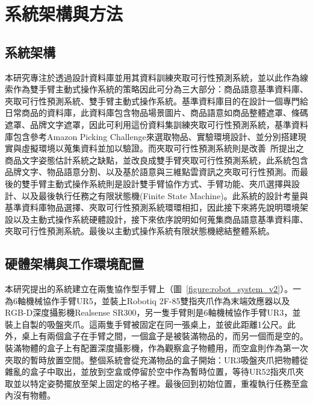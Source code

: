 \chapter{系統架構與方法}
\label{chapter:system}



\section{系統架構}
\label{sec:systemarchi}
本研究專注於透過設計資料庫並用其資料訓練夾取可行性預測系統，並以此作為線索作為雙手臂主動式操作系統的策略因此可分為三大部分：商品語意基準資料庫、夾取可行性預測系統、雙手臂主動式操作系統。基準資料庫目的在設計一個專門給日常商品的資料庫，此資料庫包含物品場景圖片、商品語意如商品整體遮罩、條碼遮罩、品牌文字遮罩，因此可利用這份資料集訓練夾取可行性預測系統，基準資料庫包含參考Amazon Picking Challenge來選取物品、實驗環境設計、並分別搭建現實與虛擬環境以蒐集資料並加以驗證。而夾取可行性預測系統則是改善~\cite{peterthesis}所提出之商品文字姿態估計系統之缺點，並改良成雙手臂夾取可行性預測系統，此系統包含品牌文字、物品語意分割、以及基於語意與三維點雲資訊之夾取可行性預測。而最後的雙手臂主動式操作系統則是設計雙手臂協作方式、手臂功能、夾爪選擇與設計、以及最後執行任務之有限狀態機(Finite State Machine)。此系統的設計考量與基準資料庫物品選擇、夾取可行性預測系統環環相扣，因此接下來將先說明環境架設以及主動式操作系統硬體設計，接下來依序說明如何蒐集商品語意基準資料庫、夾取可行性預測系統。最後以主動式操作系統有限狀態機總結整體系統。

\section{硬體架構與工作環境配置}
本研究提出的系統建立在兩隻協作型手臂上（圖~\ref{figure:robot_system_v2}）。一為6軸機械協作手臂UR5，並裝上Robotiq 2F-85雙指夾爪作為末端效應器以及RGB-D深度攝影機Realsense SR300，另一隻手臂則是6軸機械協作手臂UR3，並裝上自製的吸盤夾爪。這兩隻手臂被固定在同一張桌上，並彼此距離1公尺。此外，桌上有兩個盒子在手臂之間，一個盒子是被裝滿物品的，而另一個而是空的。裝滿物體的盒子上有配置深度攝影機，作為觀察盒子物體用，而空盒則作為第一次夾取的暫時放置空間。整個系統會從充滿物品的盒子開始：UR3吸盤夾爪把物體從雜亂的盒子中取出，並放到空盒或停留於空中作為暫時位置，等待UR52指夾爪夾取並以特定姿勢擺放至架上固定的格子裡。最後回到初始位置，重複執行任務至盒內沒有物體。

